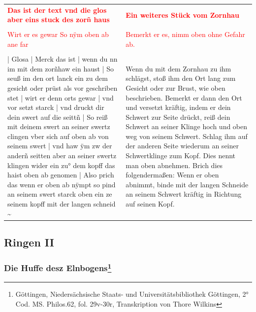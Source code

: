 \begin{longtable}{p{6.25cm}p{6.25cm}}
\textbf{\textcolor{red}{Das ist der text vnd die glos aber eins stuck des zorñ haus}}
&
\textbf{\textcolor{red}{Ein weiteres Stück vom Zornhau}}
\\
\\
\textcolor{red}{Wirt er es gewar So nÿm oben ab ane far}
&
\textcolor{red}{Bemerkt er es, nimm oben ohne Gefahr ab.}
\\
\\
| Glosa | Merck das ist | wenn du nn im mit dem zorñhaw ein haust | So seuß im den ort lanck ein zu dem gesicht oder prüst als vor geschriben stet | wirt er denn orts gewar | vnd vor setzt starck | vnd druckt dir dein swert auf die seittñ | So reiß mit deinem swert an seiner swertz clingen vber sich auf oben ab von seinem swert | vnd haw ÿm zw der anderñ seitten aber an seiner swertz klingen wider ein zu° dem kopff das haist oben ab genomen | Also prich das wenn er oben ab nÿmpt so pind an seinem swert starck oben ein ze seinem kopff mit der langen schneid \textasciitilde 
&
Wenn du mit dem Zornhau zu ihm schlägst, stoß ihm den Ort lang zum Gesicht oder zur Brust, wie oben beschrieben. Bemerkt er dann den Ort und versetzt kräftig, indem er dein Schwert zur Seite drückt, reiß dein Schwert an seiner Klinge hoch und oben weg von seinem Schwert. Schlag ihm auf der anderen Seite wiederum an seiner Schwertklinge zum Kopf. Dies nennt man oben abnehmen. Brich dies folgendermaßen: Wenn er oben abnimmt, binde mit der langen Schneide an seinem Schwert kräftig in Richtung auf seinen Kopf.
\end{longtable}

\newpage

\begin{center}
\end{center}

\newpage

\subsection{Ringen II}
\subsubsection[Die Huffe desz Elnbogens]{Die Huffe desz Elnbogens\footnote{\hspace*{0.5ex}Göttingen, Niedersächsische Staats- und Universitätsbibliothek Göttingen, 2° Cod. MS. Philos.62, fol. 29v-30r, Transkription von Thore Wilkins}}


